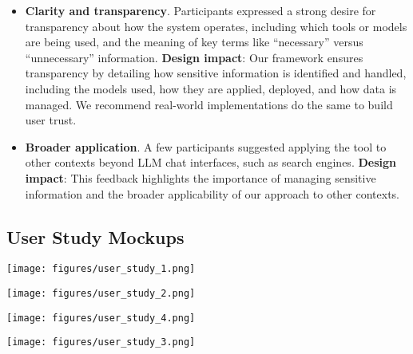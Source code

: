 \begin{itemize}[leftmargin=1em]
    \item \textbf{Clarity and transparency}. Participants expressed a strong desire for transparency about how the system operates, including which tools or models are being used, and the meaning of key terms like ``necessary'' versus ``unnecessary'' information. \textbf{Design impact}: Our framework ensures transparency by detailing how sensitive information is identified and handled, including the models used, how they are applied, deployed, and how data is managed. We recommend real-world implementations do the same to build user trust.
    \item \textbf{Broader application}. A few participants suggested applying the tool to other contexts beyond LLM chat interfaces, such as search engines. \textbf{Design impact}:  This feedback highlights the importance of managing sensitive information and the broader applicability of our approach to other contexts.
\end{itemize}


\subsection{User Study Mockups}
\label{sec::user_study_mockups}
\begin{figure*}[t]
    \centering
    
    \begin{minipage}{0.8\textwidth} %
        \centering
        \texttt{[image: figures/user\_study\_1.png]}
    \end{minipage}

    \vspace{0.5cm} %

    \begin{minipage}{0.45\textwidth}
        \centering
        \texttt{[image: figures/user\_study\_2.png]}
    \end{minipage}
    \hfill
    \begin{minipage}{0.52\textwidth}
        \centering
        \texttt{[image: figures/user\_study\_4.png]}
    \end{minipage}

    \vspace{0.5cm} %

    \begin{minipage}{0.8\textwidth}
        \centering
        \texttt{[image: figures/user\_study\_3.png]}
    \end{minipage}

    \label{fig:mockups}
\end{figure*}
